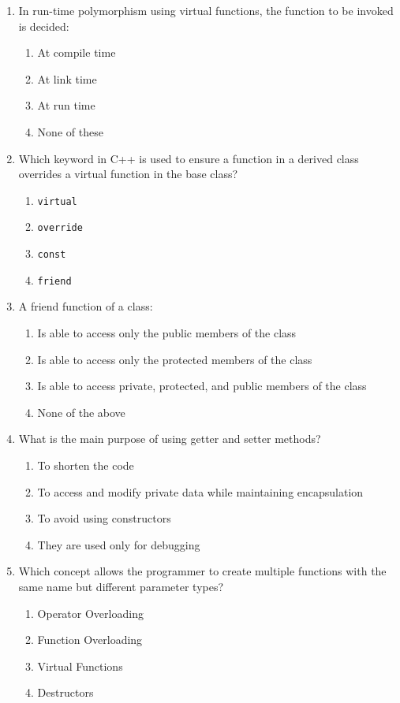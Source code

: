 \documentclass[a4paper,12pt]{article}
\begin{document}
\begin{enumerate}
    \item In run-time polymorphism using virtual functions, the function to be invoked is decided:
    \begin{enumerate}
        \item At compile time
        \item At link time
        \item At run time
        \item None of these
    \end{enumerate}
    
    \item Which keyword in C++ is used to ensure a function in a derived class overrides a virtual function in the base class?
    \begin{enumerate}
        \item \texttt{virtual}
        \item \texttt{override}
        \item \texttt{const}
        \item \texttt{friend}
    \end{enumerate}
    
    \item A friend function of a class:
    \begin{enumerate}
        \item Is able to access only the public members of the class
        \item Is able to access only the protected members of the class
        \item Is able to access private, protected, and public members of the class
        \item None of the above
    \end{enumerate}
    
    \item What is the main purpose of using getter and setter methods?
    \begin{enumerate}
        \item To shorten the code
        \item To access and modify private data while maintaining encapsulation
        \item To avoid using constructors
        \item They are used only for debugging
    \end{enumerate}
    
    \item Which concept allows the programmer to create multiple functions with the same name but different parameter types?
    \begin{enumerate}
        \item Operator Overloading
        \item Function Overloading
        \item Virtual Functions
        \item Destructors
    \end{enumerate}
\end{enumerate}
\end{document}
